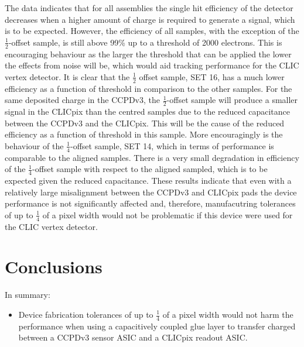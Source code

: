 The data indicates that for all assemblies the single hit efficiency of the detector decreases when a higher amount of charge is required to generate a signal, which is to be expected.  However, the efficiency of all samples, with the exception of the $\frac{1}{2}$-offset sample, is still above 99\% up to a threshold of 2000 electrons.  This is encouraging behaviour as the larger the threshold that can be applied the lower the effects from noise will be, which would aid tracking performance for the CLIC vertex detector.  It is clear that the $\frac{1}{2}$ offset sample, SET 16, has a much lower efficiency as a function of threshold in comparison to the other samples.  For the same deposited charge in the CCPDv3, the $\frac{1}{2}$-offset sample will produce a smaller signal in the CLICpix than the centred samples due to the reduced capacitance between the CCPDv3 and the CLICpix.  This will be the cause of the reduced efficiency as a function of threshold in this sample.  More encouragingly is the behaviour of the $\frac{1}{4}$-offset sample, SET 14, which in terms of performance is comparable to the aligned samples.  There is a very small degradation in efficiency of the $\frac{1}{4}$-offset sample with respect to the aligned sampled, which is to be expected given the reduced capacitance.  These results indicate that even with a relatively large misalignment between the CCPDv3 and CLICpix pads the device performance is not significantly affected and, therefore, manufacutring tolerances of up to $\frac{1}{4}$ of a pixel width would not be problematic if this device were used for the CLIC vertex detector.


\section{Conclusions}
In summary:

\begin{itemize}
\item Device fabrication tolerances of up to $\frac{1}{4}$ of a pixel width would not harm the performance when using a capacitively coupled glue layer to transfer charged between a CCPDv3 sensor ASIC and a CLICpix readout ASIC.
\end{itemize}


  
